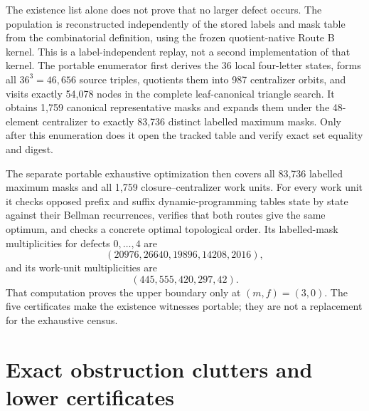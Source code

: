 \documentclass[11pt,a4paper]{article}
\theoremstyle{remark}
\begin{document}
The existence list alone does not prove that no larger defect occurs.  The
population is reconstructed independently of the stored labels and mask table
from the combinatorial definition, using the frozen quotient-native Route B
kernel.  This is a label-independent replay, not a second implementation of
that kernel.  The portable enumerator first derives
the 36 local four-letter states, forms all \(36^3=46{,}656\) source triples,
quotients them into 987 centralizer orbits, and visits exactly 54,078 nodes in
the complete leaf-canonical triangle search.  It obtains 1,759 canonical
representative masks and expands them under the 48-element centralizer to
exactly 83,736 distinct labelled maximum masks.  Only after this enumeration
does it open the tracked table and verify exact set equality and digest.

The separate portable exhaustive optimization then covers all 83,736
labelled maximum masks and all 1,759 closure--centralizer work units.  For
every work unit it checks
opposed prefix and suffix dynamic-programming tables state by state against
their Bellman recurrences, verifies that both routes give the same optimum,
and checks a concrete optimal topological order.  Its
labelled-mask multiplicities for defects \(0,\ldots,4\) are
\[
 (20976,26640,19896,14208,2016),
\]
and its work-unit multiplicities are
\[
 (445,555,420,297,42).
\]
That computation proves the upper boundary only at \((m,f)=(3,0)\).  The five
certificates make the existence witnesses portable; they are not a
replacement for the exhaustive census.

\section{Exact obstruction clutters and lower certificates}
\label{sec:obstruction-clutter}
\end{document}
